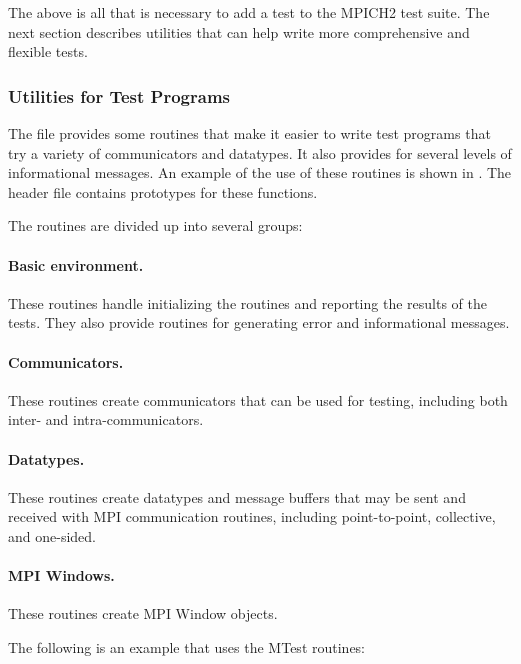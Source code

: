 The above is all that is necessary to add a test to the MPICH2 test
suite.  The next section describes utilities that can help write more
comprehensive and flexible tests.

\subsubsection{Utilities for Test Programs}
The file  provides some routines that make
it easier to write test programs that try a variety of communicators
and datatypes.  It also provides for several levels of informational
messages.  An example of the use of these routines is shown in
.   The header file
 contains prototypes for these functions.

The routines are divided up into several groups:
\paragraph{Basic environment.}
These routines handle initializing the routines and reporting the
results of the tests.  They also provide routines for generating error
and informational messages.  

\paragraph{Communicators.}
These routines create communicators that can be used for testing,
including both inter- and intra-communicators.

\paragraph{Datatypes.}
These routines create datatypes and message buffers that may be sent
and received with MPI communication routines, including
point-to-point, collective, and one-sided.  

\paragraph{MPI Windows.}
These routines create MPI Window objects.

The following is an example that uses the MTest routines:

